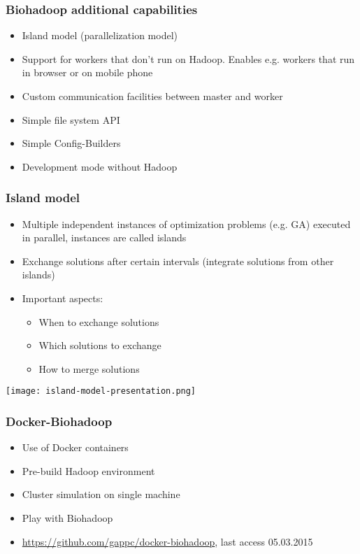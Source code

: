 \begin{frame}
  \frametitle{Biohadoop additional capabilities}
  \begin{itemize}
    \item Island model (parallelization model)
    \item Support for workers that don't run on Hadoop. Enables e.g. workers that run in browser or on mobile phone
    \item Custom communication facilities between master and worker
    \item Simple file system API
    \item Simple Config-Builders
    \item Development mode without Hadoop
  \end{itemize}
\end{frame}

\begin{frame}
  \frametitle{Island model}
  \begin{itemize}
    \item Multiple independent instances of optimization problems (e.g. GA) executed in parallel, instances are called islands
    \item Exchange solutions after certain intervals (integrate solutions from other islands)
    \item Important aspects:
    \begin{itemize}
      \item When to exchange solutions
      \item Which solutions to exchange
      \item How to merge solutions
    \end{itemize}
  \end{itemize}
  \begin{center}
    \texttt{[image: island-model-presentation.png]}
  \end{center}
\end{frame}


\begin{frame}
  \frametitle{Docker-Biohadoop}
  \begin{itemize}
    \item Use of Docker containers
    \item Pre-build Hadoop environment
    \item Cluster simulation on single machine
    \item Play with Biohadoop
    \item \url{https://github.com/gappc/docker-biohadoop}, last access 05.03.2015
  \end{itemize}
\end{frame}

